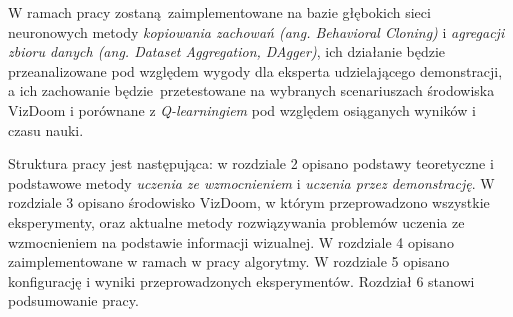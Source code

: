 W ramach pracy zostaną zaimplementowane na bazie głębokich sieci neuronowych metody \textit{kopiowania zachowań (ang. Behavioral Cloning)} i \textit{agregacji zbioru danych (ang. Dataset Aggregation, DAgger)}, ich działanie będzie przeanalizowane pod względem wygody dla eksperta udzielającego demonstracji, a ich zachowanie będzie przetestowane na wybranych scenariuszach środowiska VizDoom i porównane z \textit {Q-learningiem} pod względem osiąganych wyników i czasu nauki.

Struktura pracy jest następująca: w rozdziale 2 opisano podstawy teoretyczne i podstawowe metody \textit{uczenia ze wzmocnieniem} i \textit{uczenia przez demonstrację}. W rozdziale 3 opisano środowisko VizDoom, w którym przeprowadzono wszystkie eksperymenty, oraz aktualne metody rozwiązywania problemów uczenia ze wzmocnieniem na podstawie informacji wizualnej. W rozdziale 4 opisano zaimplementowane w ramach w pracy algorytmy. W rozdziale 5 opisano konfigurację i wyniki przeprowadzonych eksperymentów. Rozdział 6 stanowi podsumowanie pracy.




